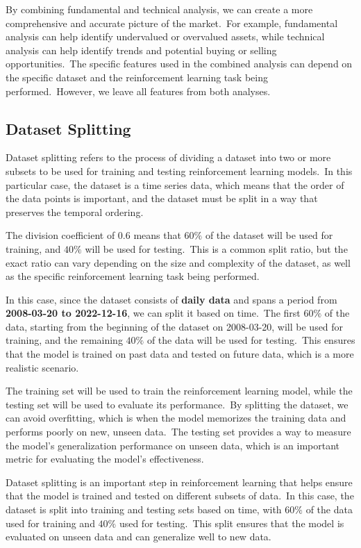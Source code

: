 \documentclass[../xlapes02]{subfiles}
\begin{document}
    By combining fundamental and technical analysis, we can create a more comprehensive and accurate picture of the market.\ For example, fundamental analysis can help identify undervalued or overvalued assets, while technical analysis can help identify trends and potential buying or selling opportunities.\ The specific features used in the combined analysis can depend on the specific dataset and the reinforcement learning task being performed.\ However, we leave all features from both analyses.

    \subsection{Dataset Splitting}\label{subsec:dataset-splitting}
    Dataset splitting refers to the process of dividing a dataset into two or more subsets to be used for training and testing reinforcement learning models.\ In this particular case, the dataset is a time series data, which means that the order of the data points is important, and the dataset must be split in a way that preserves the temporal ordering.

    The division coefficient of $0.6$ means that $60\%$ of the dataset will be used for training, and $40\%$ will be used for testing.\ This is a common split ratio, but the exact ratio can vary depending on the size and complexity of the dataset, as well as the specific reinforcement learning task being performed.

    In this case, since the dataset consists of \textbf{daily data} and spans a period from \textbf{2008-03-20 to 2022-12-16}, we can split it based on time.\ The first $60\%$ of the data, starting from the beginning of the dataset on 2008-03-20, will be used for training, and the remaining $40\%$ of the data will be used for testing.\ This ensures that the model is trained on past data and tested on future data, which is a more realistic scenario.

    The training set will be used to train the reinforcement learning model, while the testing set will be used to evaluate its performance.\ By splitting the dataset, we can avoid overfitting, which is when the model memorizes the training data and performs poorly on new, unseen data.\ The testing set provides a way to measure the model's generalization performance on unseen data, which is an important metric for evaluating the model's effectiveness.

    Dataset splitting is an important step in reinforcement learning that helps ensure that the model is trained and tested on different subsets of data.\ In this case, the dataset is split into training and testing sets based on time, with $60\%$ of the data used for training and $40\%$ used for testing.\ This split ensures that the model is evaluated on unseen data and can generalize well to new data.
\end{document}
